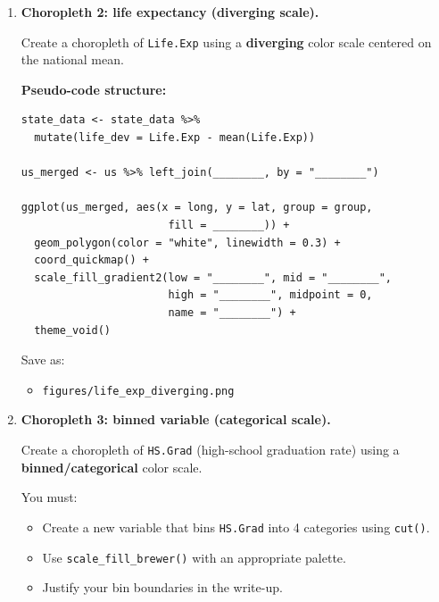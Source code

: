 \documentclass[11pt]{article}
\begin{document}
\begin{enumerate}
\textbf{Pseudo-code structure:}

\begin{verbatim}
us_merged <- us %>% left_join(________, by = "________")

ggplot(us_merged, aes(x = long, y = lat, group = group,
                       fill = ________)) +
  geom_polygon(color = "white", linewidth = 0.3) +
  coord_quickmap() +
  scale_fill_viridis_c(name = "________") +
  theme_void()
\end{verbatim}

Save as:
\begin{itemize}
  \item \texttt{figures/murder\_rate\_map.png}
\end{itemize}

\item \textbf{Choropleth 2: life expectancy (diverging scale).}

Create a choropleth of \texttt{Life.Exp} using a \textbf{diverging} color scale centered on the national mean.

\textbf{Pseudo-code structure:}

\begin{verbatim}
state_data <- state_data %>%
  mutate(life_dev = Life.Exp - mean(Life.Exp))

us_merged <- us %>% left_join(________, by = "________")

ggplot(us_merged, aes(x = long, y = lat, group = group,
                       fill = ________)) +
  geom_polygon(color = "white", linewidth = 0.3) +
  coord_quickmap() +
  scale_fill_gradient2(low = "________", mid = "________",
                       high = "________", midpoint = 0,
                       name = "________") +
  theme_void()
\end{verbatim}

Save as:
\begin{itemize}
  \item \texttt{figures/life\_exp\_diverging.png}
\end{itemize}

\item \textbf{Choropleth 3: binned variable (categorical scale).}

Create a choropleth of \texttt{HS.Grad} (high-school graduation rate) using a \textbf{binned/categorical} color scale.

You must:
\begin{itemize}
  \item Create a new variable that bins \texttt{HS.Grad} into 4 categories using \texttt{cut()}.
  \item Use \texttt{scale\_fill\_brewer()} with an appropriate palette.
  \item Justify your bin boundaries in the write-up.
\end{itemize}


\end{enumerate}
\end{document}
